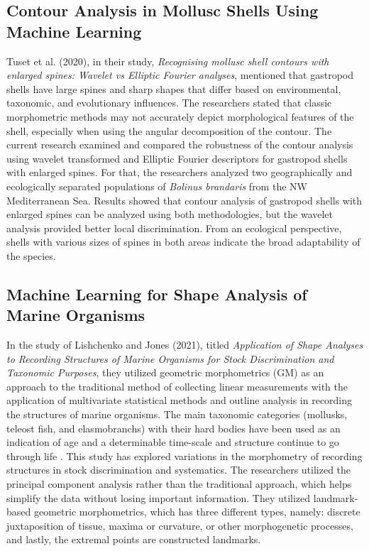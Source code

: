 \subsection{Contour Analysis in Mollusc Shells Using Machine Learning}
Tuset et al. (2020), in their study, \textit{Recognising mollusc shell contours with enlarged spines: Wavelet vs Elliptic Fourier analyses}, mentioned that gastropod shells have large spines and sharp shapes that differ based on environmental, taxonomic, and evolutionary influences. The researchers stated that classic morphometric methods may not accurately depict morphological features of the shell, especially when using the angular decomposition of the contour. The current research examined and compared the robustness of the contour analysis using wavelet transformed and Elliptic Fourier descriptors for gastropod shells with enlarged spines. For that, the researchers analyzed two geographically and ecologically separated populations of \textit{Bolinus brandaris} from the NW Mediterranean Sea. Results showed that contour analysis of gastropod shells with enlarged spines can be analyzed using both methodologies, but the wavelet analysis provided better local discrimination. From an ecological perspective, shells with various sizes of spines in both areas indicate the broad adaptability of the species.

\subsection{Machine Learning for Shape Analysis of Marine Organisms}
In the study of Lishchenko and Jones (2021), titled \textit{Application of Shape Analyses to Recording Structures of Marine Organisms for Stock Discrimination and Taxonomic Purposes}, they utilized geometric morphometrics (GM) as an approach to the traditional method of collecting linear measurements with the application of multivariate statistical methods and outline analysis in recording the structures of marine organisms. The main taxonomic categories (mollusks, teleost fish, and elasmobranchs) with their hard bodies have been used as an indication of age and a determinable time-scale and structure continue to go through life \cite{arkhipkin2005, kerr2014}. This study has explored variations in the morphometry of recording structures in stock discrimination and systematics. The researchers utilized the principal component analysis rather than the traditional approach, which helps simplify the data without losing important information. They utilized landmark-based geometric morphometrics, which has three different types, namely: discrete juxtaposition of tissue, maxima or curvature, or other morphogenetic processes, and lastly, the extremal points are constructed landmarks.

